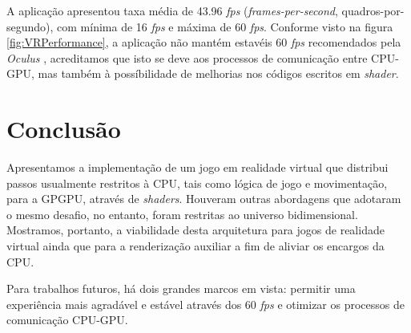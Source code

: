 \documentclass[conference]{IEEEtran}
\begin{document}
A aplicação apresentou taxa média de 43.96 \textit{fps} (\textit{frames-per-second}, quadros-por-segundo), com mínima de 16 \textit{fps} e máxima de 60 \textit{fps}. Conforme visto na figura \ref{fig:VRPerformance}, a aplicação não mantém estavéis 60 \textit{fps} recomendados pela \textit{Oculus} \cite{OculusVRGuidelines}, acreditamos que isto se deve aos processos de comunicação entre CPU-GPU, mas também à possíbilidade de melhorias nos códigos escritos em \textit{shader}.

\section{Conclusão}\label{sec:conclusion}
Apresentamos a implementação de um jogo em realidade virtual que distribui passos usualmente restritos à CPU, tais como lógica de jogo e movimentação, para a GPGPU, através de \textit{shaders}. Houveram outras abordagens que adotaram o mesmo desafio, no entanto, foram restritas ao universo bidimensional. Mostramos, portanto, a viabilidade desta arquitetura para jogos de realidade virtual ainda que para a renderização auxiliar a fim de aliviar os encargos da CPU. 

Para trabalhos futuros, há dois grandes marcos em vista: permitir uma experiência mais agradável e estável através dos 60 \textit{fps} e otimizar os processos de comunicação CPU-GPU.




\end{document}
